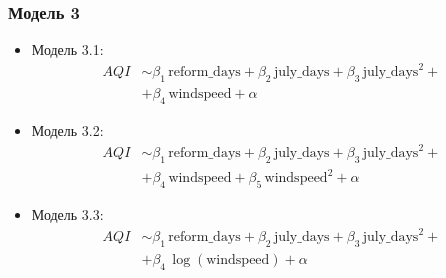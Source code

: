 \documentclass{beamer}
\begin{document}
\begin{frame}
  \frametitle{Модель 3}

  \begin{itemize}
    \item Модель 3.1:
    \begin{equation*}
      \begin{aligned}
        AQI & \sim \beta_1 \, \text{reform\_days} +  \beta_2 \, \text{july\_days} +  \beta_3 \, \text{july\_days}^2 +\\
               & + \beta_4 \, \text{windspeed} + \alpha
      \end{aligned}
    \end{equation*}
    \item Модель 3.2:
    \begin{equation*}
      \begin{aligned}
        AQI & \sim \beta_1 \, \text{reform\_days} +  \beta_2 \, \text{july\_days} +  \beta_3 \, \text{july\_days}^2 +\\
               & +  \beta_4 \, \text{windspeed} +  \beta_5 \, \text{windspeed}^2  + \alpha
      \end{aligned}
    \end{equation*}
    \item Модель 3.3:
    \begin{equation*}
      \begin{aligned}
        AQI & \sim \beta_1 \, \text{reform\_days} +  \beta_2 \, \text{july\_days} +  \beta_3 \, \text{july\_days}^2 +\\
               & + \beta_4 \, \log(\text{windspeed}) + \alpha
      \end{aligned}
    \end{equation*}
  \end{itemize}
\end{frame}
\end{document}
